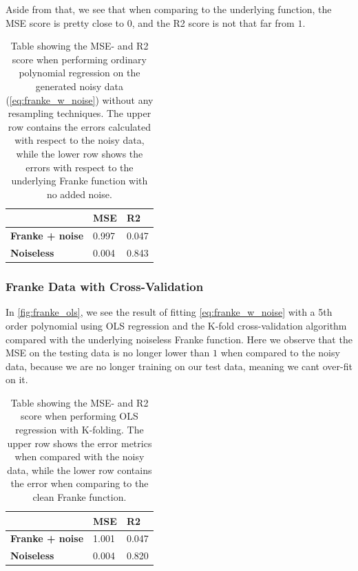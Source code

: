 \documentclass[10pt, twocolumn]{article}
\begin{document}
Aside from that, we see that when comparing to the underlying function, the MSE score is pretty close to $0$, and the R2 score is not that far from $1$.

\begin{table}
\centering
\begin{tabular}{l|l|l|}
\cline{2-3}
                                              & \textbf{MSE} & \textbf{R2} \\ \hline
\multicolumn{1}{|l|}{\textbf{Franke + noise}} & 0.997        & 0.047       \\ \hline
\multicolumn{1}{|l|}{\textbf{Noiseless}}      & 0.004        & 0.843       \\ \hline
\end{tabular}
\caption{Table showing the MSE- and R2 score when performing ordinary polynomial regression on the generated noisy data (\cref{eq:franke_w_noise}) without any resampling techniques. The upper row contains the errors calculated with respect to the noisy data, while the lower row shows the errors with respect to the underlying Franke function with no added noise.}
\label{tab:Franke_metrics_no_kfold}
\end{table}




\subsubsection{Franke Data with Cross-Validation}
In \cref{fig:franke_ols}, we see the result of fitting \cref{eq:franke_w_noise} with a 5th order polynomial using OLS regression and the K-fold cross-validation algorithm compared with the underlying noiseless Franke function. Here we observe that the MSE on the testing data is no longer lower than $1$ when compared to the noisy data, because we are no longer training on our test data, meaning we cant over-fit on it.

\begin{table}[h!]
\centering
\begin{tabular}{l|l|l|}
\cline{2-3}
                                              & \textbf{MSE} & \textbf{R2} \\ \hline
\multicolumn{1}{|l|}{\textbf{Franke + noise}} & 1.001        & 0.047       \\ \hline
\multicolumn{1}{|l|}{\textbf{Noiseless}}      & 0.004        & 0.820       \\ \hline
\end{tabular}
\caption{Table showing the MSE- and R2 score when performing OLS regression with K-folding. The upper row shows the error metrics when compared with the noisy data, while the lower row contains the error when comparing to the clean Franke function.}
\label{tab:Franke_metrics}
\end{table}
\end{document}
